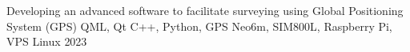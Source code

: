 



\begin{cvhonors}


  \cvhonor
    {Developing an advanced software to facilitate surveying using Global Positioning System (GPS)} %
    {QML, Qt C++, Python, GPS Neo6m, SIM800L, Raspberry Pi, VPS Linux} %
    {} %
    {2023} %

\vspace{10pt}
    

\end{cvhonors}


    {} %
    {} %
    {} %
    {} %
